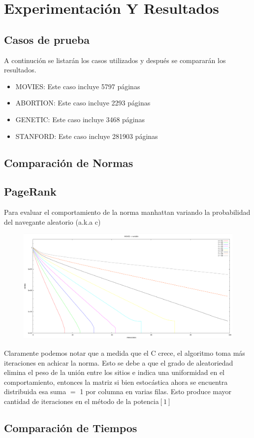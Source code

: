 \section{Experimentación Y Resultados}

\subsection{Casos de prueba}
   A continución se listarán los casos utilizados y después se compararán los resultados.

	\begin{itemize}
		\item MOVIES: Este caso incluye 5797 páginas
		\item ABORTION: Este caso incluye 2293 páginas
		\item GENETIC: Este caso incluye 3468 páginas
		\item STANFORD: Este caso incluye 281903 páginas
	\end{itemize}   

\subsection{Comparación de Normas}

\subsection {PageRank}

Para evaluar el comportamiento de la norma manhattan variando la probabilidad del navegante aleatorio (a.k.a c)

\begin{figure}[h!]
   \centering
    \includegraphics[width=1\textwidth]{imagenes/pagerank_norma.png}
\end{figure}

Claramente podemos notar que a medida que el C crece, el algoritmo toma más iteraciones en achicar la norma. Esto se debe a que el grado de aleatoriedad elimina el peso de la unión entre los sitios e indica una uniformidad en el comportamiento, entonces la matriz si bien estocástica ahora se encuentra distribuida esa suma $=$ 1 por columna en varias filas. Esto produce mayor cantidad de iteraciones en el método de la potencia$[1]$

\subsection{Comparación de Tiempos}
 

